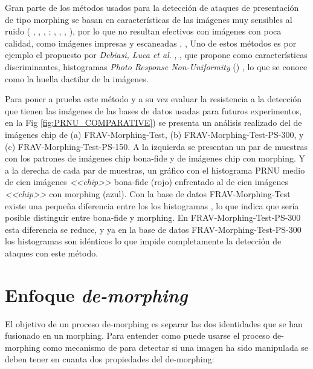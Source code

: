 Gran parte de los métodos usados para la detección de ataques de presentación de tipo \gls{morphing} se basan en características de las imágenes muy sensibles al ruido ( \cite{jassim2018automatic}, \cite{spreeuwers2018towards}, \cite{damer2018morgan}, \cite{wandzik2018morphing};  \cite{debiasi2018prnu}, \cite{debiasi2018prnuvar},  \cite{lowe2004distinctive}, \cite{neubert2017face}), por lo que no resultan efectivos con imágenes con poca calidad, como imágenes impresas y escaneadas \cite{ferrara2019face}, \cite{raghavendra2017face}, Uno de estos métodos es por ejemplo el propuesto por \textit{Debiasi, Luca et al}. \cite{debiasi2018prnuvar}, \cite{debiasi2018prnu}, que propone como características discriminantes, histogramas \textit{Photo Response Non-Uniformity} () \cite{lukas2006digital}, lo que se conoce como la huella dactilar de la imágenes.

Para poner a prueba este método y a su vez evaluar la resistencia a la detección que tienen las imágenes de las bases de datos usadas para futuros experimentos, en la Fig \ref{fig:PRNU_COMPARATIVE}) se presenta un análisis realizado del  de imágenes \gls{chip} de (a) \Gls{FRAV-Morphing-Test}, (b) \Gls{FRAV-Morphing-Test-PS-300}, y (c) \Gls{FRAV-Morphing-Test-PS-150}. A la izquierda se presentan un par de muestras con los patrones  de imágenes \gls{chip} \gls{bona-fide} y de imágenes \gls{chip} con \gls{morphing}. Y a la derecha de cada par de muestras, un gráfico con el histograma \gls{PRNU} medio de cien imágenes \textit{<<\gls{chip}>>} \gls{bona-fide} (rojo) enfrentado al de cien imágenes \textit{<<\gls{chip}>>} con \gls{morphing} (azul). Con la base de datos \Gls{FRAV-Morphing-Test} existe una pequeña diferencia entre los los histogramas , lo que indica que sería posible distinguir entre \gls{bona-fide} y \gls{morphing}. En \Gls{FRAV-Morphing-Test-PS-300} esta diferencia se reduce, y ya en la base de datos \Gls{FRAV-Morphing-Test-PS-300} los histogramas son idénticos lo que impide completamente la detección de ataques con este método.

\section{Enfoque \textit{de-morphing}} \label{sec:de-morphingApproach}

El objetivo de un proceso \gls{de-morphing} es separar las dos identidades que se han fusionado en un \gls{morphing}. Para entender como puede usarse el proceso \gls{de-morphing} como mecanismo de  para detectar si una imagen ha sido manipulada se deben tener en cuanta dos propiedades del \gls{de-morphing}: 

